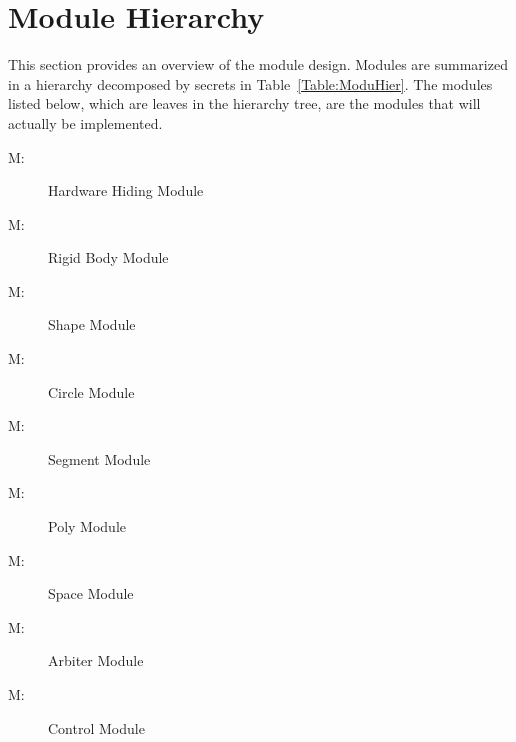 \documentclass[12pt]{article}
\newcounter{modnum}
\newcommand{\mthemodnum}{M\themodnum}
\begin{document}
\section{Module Hierarchy}
\label{Sec:ModuHier}
This section provides an overview of the module design. Modules are summarized in a hierarchy decomposed by secrets in Table~\ref{Table:ModuHier}. The modules listed below, which are leaves in the hierarchy tree, are the modules that will actually be implemented.
\begin{description}
\item[\mthemodnum\label{M:hwHiding}:]Hardware Hiding Module
\end{description}
\begin{description}
\item[\mthemodnum\label{M:modbodyserv}:]Rigid Body Module
\end{description}
\begin{description}
\item[\mthemodnum\label{M:modshapeserv}:]Shape Module
\end{description}
\begin{description}
\item[\mthemodnum\label{M:modcircleserv}:]Circle Module
\end{description}
\begin{description}
\item[\mthemodnum\label{M:modsegmentserv}:]Segment Module
\end{description}
\begin{description}
\item[\mthemodnum\label{M:modpolyserv}:]Poly Module
\end{description}
\begin{description}
\item[\mthemodnum\label{M:modspaceserv}:]Space Module
\end{description}
\begin{description}
\item[\mthemodnum\label{M:modarbiterserv}:]Arbiter Module
\end{description}
\begin{description}
\item[\mthemodnum\label{M:modControl}:]Control Module
\end{description}
\end{document}
